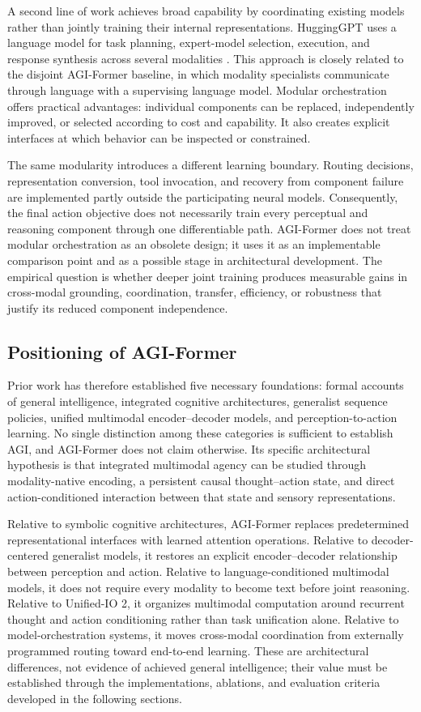A second line of work achieves broad capability by coordinating existing models rather than jointly training their internal representations. HuggingGPT uses a language model for task planning, expert-model selection, execution, and response synthesis across several modalities \cite{shen2023hugginggpt}. This approach is closely related to the disjoint AGI-Former baseline, in which modality specialists communicate through language with a supervising language model. Modular orchestration offers practical advantages: individual components can be replaced, independently improved, or selected according to cost and capability. It also creates explicit interfaces at which behavior can be inspected or constrained.

The same modularity introduces a different learning boundary. Routing decisions, representation conversion, tool invocation, and recovery from component failure are implemented partly outside the participating neural models. Consequently, the final action objective does not necessarily train every perceptual and reasoning component through one differentiable path. AGI-Former does not treat modular orchestration as an obsolete design; it uses it as an implementable comparison point and as a possible stage in architectural development. The empirical question is whether deeper joint training produces measurable gains in cross-modal grounding, coordination, transfer, efficiency, or robustness that justify its reduced component independence.

\subsection{\textbf{Positioning of AGI-Former}}

Prior work has therefore established five necessary foundations: formal accounts of general intelligence, integrated cognitive architectures, generalist sequence policies, unified multimodal encoder--decoder models, and perception-to-action learning. No single distinction among these categories is sufficient to establish AGI, and AGI-Former does not claim otherwise. Its specific architectural hypothesis is that integrated multimodal agency can be studied through modality-native encoding, a persistent causal thought--action state, and direct action-conditioned interaction between that state and sensory representations.

Relative to symbolic cognitive architectures, AGI-Former replaces predetermined representational interfaces with learned attention operations. Relative to decoder-centered generalist models, it restores an explicit encoder--decoder relationship between perception and action. Relative to language-conditioned multimodal models, it does not require every modality to become text before joint reasoning. Relative to Unified-IO 2, it organizes multimodal computation around recurrent thought and action conditioning rather than task unification alone. Relative to model-orchestration systems, it moves cross-modal coordination from externally programmed routing toward end-to-end learning. These are architectural differences, not evidence of achieved general intelligence; their value must be established through the implementations, ablations, and evaluation criteria developed in the following sections.
